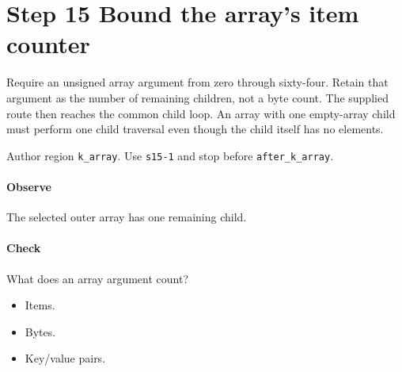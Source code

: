 \section{Step 15 Bound the array's item counter}\label{cbor-s15}
Require an unsigned array argument from zero through sixty-four. Retain that argument as the number of remaining children, not a byte count. The supplied route then reaches the common child loop. An array with one empty-array child must perform one child traversal even though the child itself has no elements.

Author region \texttt{k\_array}. Use \texttt{s15-1} and stop before \texttt{after\_k\_array}.

\paragraph{Observe} The selected outer array has one remaining child.

\paragraph{Check} What does an array argument count?
\begin{itemize}
  \item[A.] Items.
  \item[B.] Bytes.
  \item[C.] Key/value pairs.
\end{itemize}
